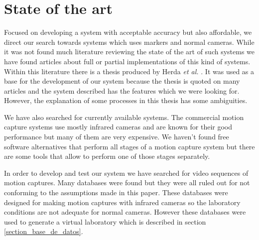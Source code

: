 \section{State of the art}\label{estadoDelArte}

Focused on developing a system with acceptable accuracy but also affordable, we direct our search towards systems which uses markers and normal cameras. While it was not found much literature reviewing the state of the art of such systems we have found articles about full or partial implementations of this kind of systems. Within this literature there is a thesis produced by Herda \textit{et al.} \cite{herda}. It was used as a base for the development of our system because the thesis is quoted on many articles and the system described has the features which we were looking for. However, the explanation of some processes in this thesis has some ambiguities.

We have also searched for currently available systems. The commercial motion capture systems use mostly infrared cameras and are known for their good performance but many of them are very expensive. We haven't found free software alternatives that perform all stages of a motion capture system but there are some tools that allow to perform one of those stages separately.

In order to develop and test our system we have searched for video sequences of motion captures. Many databases were found but they were all ruled out for not conforming to the assumptions made in this paper. These databases were designed for making motion captures with infrared cameras so the laboratory conditions are not adequate for normal cameras. However these databases were used to generate a virtual laboratory which is described in section \ref{section_base_de_datos}.



